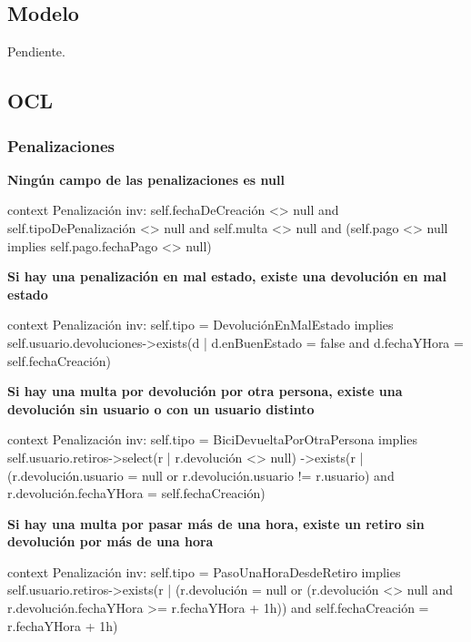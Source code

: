 \documentclass[a4paper, 10pt, twoside]{article}
\newenvironment{ocl}[1]
  {
    \textbf{#1}
    \verbatim
  }{
    \endverbatim
  }
\begin{document}
\subsection{Modelo}

Pendiente.


\subsection{OCL}


\subsubsection{Penalizaciones}

\begin{ocl}{Ningún campo de las penalizaciones es null}
  context Penalización
  inv: self.fechaDeCreación <> null and
       self.tipoDePenalización <> null and
       self.multa <> null and
       (self.pago <> null implies self.pago.fechaPago <> null)
\end{ocl}

\begin{ocl}{Si hay una penalización en mal estado, existe una devolución en mal estado}
  context Penalización
  inv: self.tipo = DevoluciónEnMalEstado implies self.usuario.devoluciones->exists(d |
           d.enBuenEstado = false and d.fechaYHora = self.fechaCreación)
\end{ocl}

\begin{ocl}{Si hay una multa por devolución por otra persona, existe una devolución sin usuario o con un usuario distinto}
  context Penalización
  inv: self.tipo = BiciDevueltaPorOtraPersona implies
           self.usuario.retiros->select(r | r.devolución <> null)
                               ->exists(r | (r.devolución.usuario = null or
                                             r.devolución.usuario != r.usuario) and
                                            r.devolución.fechaYHora = self.fechaCreación)
\end{ocl}

\begin{ocl}{Si hay una multa por pasar más de una hora, existe un retiro sin devolución por más de una hora}
  context Penalización
  inv: self.tipo = PasoUnaHoraDesdeRetiro implies self.usuario.retiros->exists(r |
           (r.devolución = null or (r.devolución <> null and
                                    r.devolución.fechaYHora >= r.fechaYHora + 1h)) and
           self.fechaCreación = r.fechaYHora + 1h)
\end{ocl}
\end{document}
